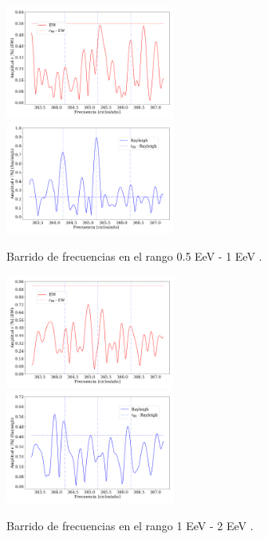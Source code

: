 \begin{figure}[H]
    \begin{small}
        \begin{center}
            \includegraphics[width=0.4955\textwidth]{plot_bin_2_barrido_v3_EW.pdf}
            \includegraphics[width=0.4955\textwidth]{plot_bin_2_barrido_v1_Ray.pdf}
        \end{center}
        \caption{Barrido de frecuencias en el rango 0.5 EeV - 1 EeV .}
        \label{fig:segundo_barrido_EW_Ray}
    \end{small}
\end{figure}    

\begin{figure}[H]
    \begin{small}
        \begin{center}
            \includegraphics[width=0.4955\textwidth]{plot_bin_3_barrido_v3_EW.pdf}
            \includegraphics[width=0.4955\textwidth]{plot_bin_3_barrido_v1_Ray.pdf}
        \end{center}
        \caption{Barrido de frecuencias en el rango 1 EeV - 2 EeV .}
        \label{fig:tercer_barrido_EW_Ray}
    \end{small}
\end{figure}    

